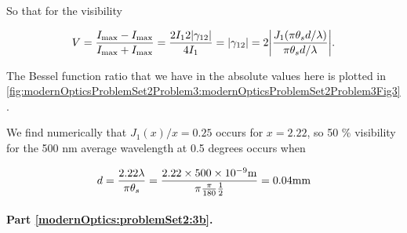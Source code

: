 {So that for the visibility 

\begin{dmath}\label{eqn:modernOptics:ProblemSet2:P3:490}
V = \frac
{
I_{\mathrm{max}}
- I_{\mathrm{max}}
}
{
I_{\mathrm{max}}
+ I_{\mathrm{max}}
}
=
\frac{2 I_1 2 \Abs{\gamma_{12}}}{4 I_1}
= \Abs{\gamma_{12}}
=
2 \Abs{\frac{J_1(\pi \theta_s d/\lambda)}{\pi \theta_s d/\lambda}}.
\end{dmath}

The Bessel function ratio that we have in the absolute values here is plotted in \cref{fig:modernOpticsProblemSet2Problem3:modernOpticsProblemSet2Problem3Fig3}.


We find numerically that $J_1(x)/x = 0.25$ occurs for $x = 2.22$, so 50 \% visibility for the 500 nm average wavelength at 0.5 degrees occurs when

\begin{dmath}\label{eqn:modernOptics:ProblemSet2:P3:510}
d 
= \frac{2.22 \lambda}{\pi \theta_s} 
= \frac{2.22 \times 500 \times 10^{-9} \text{m}}{\pi \frac{\pi}{180} \inv{2}} 
= 0.04 \text{mm}
\end{dmath}


\paragraph{Part \ref{modernOptics:problemSet2:3b}.  }

%


}
